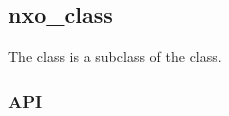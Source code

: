 %
%
%
%
%              

\subsection{nxo\_class}
\label{nxo_class}

The  class is a subclass of the  class.

\subsubsection{API}
